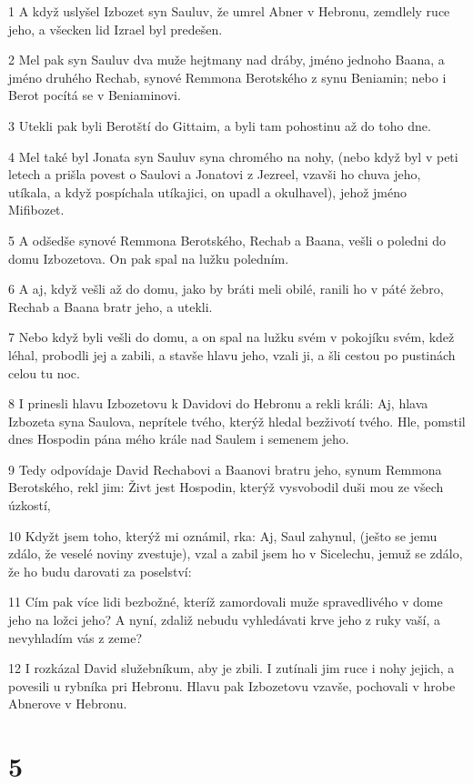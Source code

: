 \par 1 A když uslyšel Izbozet syn Sauluv, že umrel Abner v Hebronu, zemdlely ruce jeho, a všecken lid Izrael byl predešen.
\par 2 Mel pak syn Sauluv dva muže hejtmany nad dráby, jméno jednoho Baana, a jméno druhého Rechab, synové Remmona Berotského z synu Beniamin; nebo i Berot pocítá se v Beniaminovi.
\par 3 Utekli pak byli Berotští do Gittaim, a byli tam pohostinu až do toho dne.
\par 4 Mel také byl Jonata syn Sauluv syna chromého na nohy, (nebo když byl v peti letech a prišla povest o Saulovi a Jonatovi z Jezreel, vzavši ho chuva jeho, utíkala, a když pospíchala utíkajici, on upadl a okulhavel), jehož jméno Mifibozet.
\par 5 A odšedše synové Remmona Berotského, Rechab a Baana, vešli o poledni do domu Izbozetova. On pak spal na lužku poledním.
\par 6 A aj, když vešli až do domu, jako by bráti meli obilé, ranili ho v páté žebro, Rechab a Baana bratr jeho, a utekli.
\par 7 Nebo když byli vešli do domu, a on spal na lužku svém v pokojíku svém, kdež léhal, probodli jej a zabili, a stavše hlavu jeho, vzali ji, a šli cestou po pustinách celou tu noc.
\par 8 I prinesli hlavu Izbozetovu k Davidovi do Hebronu a rekli králi: Aj, hlava Izbozeta syna Saulova, neprítele tvého, kterýž hledal bezživotí tvého. Hle, pomstil dnes Hospodin pána mého krále nad Saulem i semenem jeho.
\par 9 Tedy odpovídaje David Rechabovi a Baanovi bratru jeho, synum Remmona Berotského, rekl jim: Živt jest Hospodin, kterýž vysvobodil duši mou ze všech úzkostí,
\par 10 Kdyžt jsem toho, kterýž mi oznámil, rka: Aj, Saul zahynul, (ješto se jemu zdálo, že veselé noviny zvestuje), vzal a zabil jsem ho v Sicelechu, jemuž se zdálo, že ho budu darovati za poselství:
\par 11 Cím pak více lidi bezbožné, kteríž zamordovali muže spravedlivého v dome jeho na ložci jeho? A nyní, zdaliž nebudu vyhledávati krve jeho z ruky vaší, a nevyhladím vás z zeme?
\par 12 I rozkázal David služebníkum, aby je zbili. I zutínali jim ruce i nohy jejich, a povesili u rybníka pri Hebronu. Hlavu pak Izbozetovu vzavše, pochovali v hrobe Abnerove v Hebronu.

\chapter{5}

